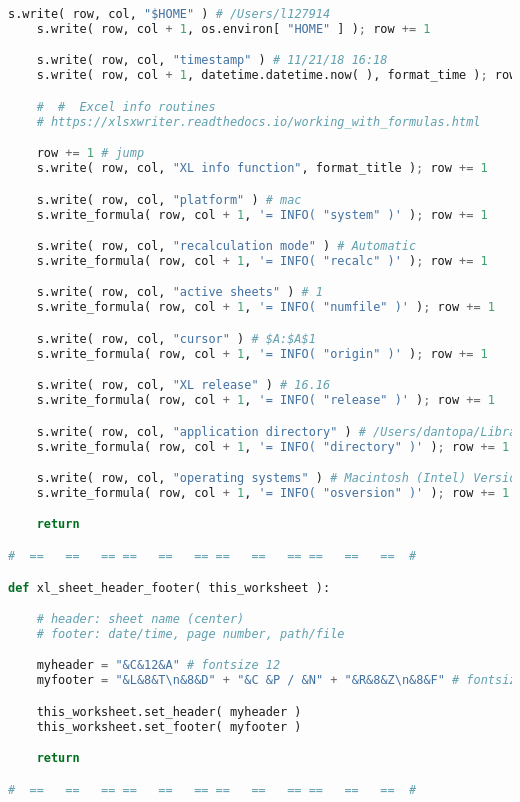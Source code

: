 {{\begin{lstlisting}[language=Python]
    s.write( row, col, "$HOME" ) # /Users/l127914
    s.write( row, col + 1, os.environ[ "HOME" ] ); row += 1

    s.write( row, col, "timestamp" ) # 11/21/18 16:18
    s.write( row, col + 1, datetime.datetime.now( ), format_time ); row += 1

    #  #  Excel info routines
    # https://xlsxwriter.readthedocs.io/working_with_formulas.html

    row += 1 # jump
    s.write( row, col, "XL info function", format_title ); row += 1

    s.write( row, col, "platform" ) # mac
    s.write_formula( row, col + 1, '= INFO( "system" )' ); row += 1

    s.write( row, col, "recalculation mode" ) # Automatic
    s.write_formula( row, col + 1, '= INFO( "recalc" )' ); row += 1

    s.write( row, col, "active sheets" ) # 1
    s.write_formula( row, col + 1, '= INFO( "numfile" )' ); row += 1

    s.write( row, col, "cursor" ) # $A:$A$1
    s.write_formula( row, col + 1, '= INFO( "origin" )' ); row += 1

    s.write( row, col, "XL release" ) # 16.16
    s.write_formula( row, col + 1, '= INFO( "release" )' ); row += 1

    s.write( row, col, "application directory" ) # /Users/dantopa/Library/Containers/com.microsoft.Excel/Data/Documents/
    s.write_formula( row, col + 1, '= INFO( "directory" )' ); row += 1

    s.write( row, col, "operating systems" ) # Macintosh (Intel) Version 10.13.3 (Build 17D47)
    s.write_formula( row, col + 1, '= INFO( "osversion" )' ); row += 1

    return

#  ==   ==   == ==   ==   == ==   ==   == ==   ==   ==  #

def xl_sheet_header_footer( this_worksheet ):

    # header: sheet name (center)
    # footer: date/time, page number, path/file

    myheader = "&C&12&A" # fontsize 12
    myfooter = "&L&8&T\n&8&D" + "&C &P / &N" + "&R&8&Z\n&8&F" # fontsize 8

    this_worksheet.set_header( myheader )
    this_worksheet.set_footer( myfooter )

    return

#  ==   ==   == ==   ==   == ==   ==   == ==   ==   ==  #


\end{lstlisting}}}
